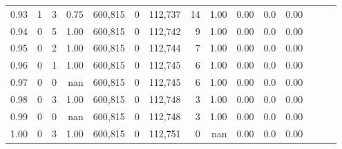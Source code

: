 \begin{tabular}{rrrrrrrrrrrrrrr}
0.93 &       1 &      3 &  0.75 &  600,815 &        0 &  112,737 &       14 &  1.00 &  0.00 &                     0.0 &      0.00 \\
0.94 &       0 &      5 &  1.00 &  600,815 &        0 &  112,742 &        9 &  1.00 &  0.00 &                     0.0 &      0.00 \\
0.95 &       0 &      2 &  1.00 &  600,815 &        0 &  112,744 &        7 &  1.00 &  0.00 &                     0.0 &      0.00 \\
0.96 &       0 &      1 &  1.00 &  600,815 &        0 &  112,745 &        6 &  1.00 &  0.00 &                     0.0 &      0.00 \\
0.97 &       0 &      0 &   nan &  600,815 &        0 &  112,745 &        6 &  1.00 &  0.00 &                     0.0 &      0.00 \\
0.98 &       0 &      3 &  1.00 &  600,815 &        0 &  112,748 &        3 &  1.00 &  0.00 &                     0.0 &      0.00 \\
0.99 &       0 &      0 &   nan &  600,815 &        0 &  112,748 &        3 &  1.00 &  0.00 &                     0.0 &      0.00 \\
1.00 &       0 &      3 &  1.00 &  600,815 &        0 &  112,751 &        0 &   nan &  0.00 &                     0.0 &      0.00 \\
\bottomrule
\end{tabular}
